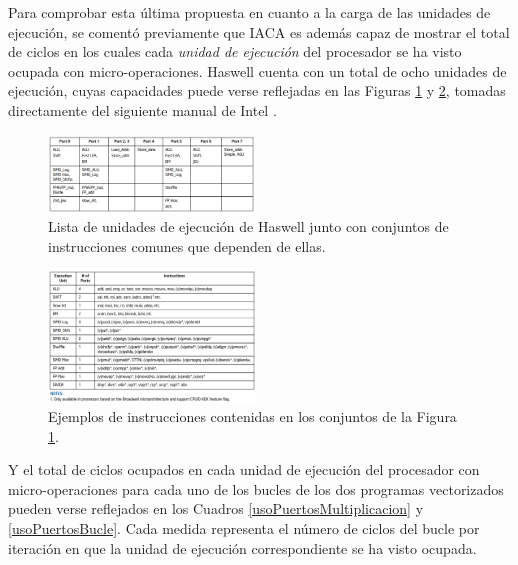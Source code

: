 \documentclass[conference]{IEEEtran}
\begin{document}
Para comprobar esta última propuesta en cuanto a la carga de las unidades de ejecución, se comentó previamente que IACA es además capaz de mostrar el total de ciclos en los cuales cada \textit{unidad de ejecución} del procesador se ha visto ocupada con micro-operaciones. Haswell cuenta con un total de ocho unidades de ejecución, cuyas capacidades puede verse reflejadas en las Figuras \ref{tablaUnidadesEjecucion} y \ref{tablaInstrucciones}, tomadas directamente del siguiente manual de Intel \cite{manualIntel}.

\begin{figure}[htbp]
    \centering
        \includegraphics[width=0.49\textwidth]{tablaUnidadesEjecucion.png}
        \caption{Lista de unidades de ejecución de Haswell junto con conjuntos de instrucciones comunes que dependen de ellas.}
        \label{tablaUnidadesEjecucion}
\end{figure}

\begin{figure}[htbp]
    \centering
        \includegraphics[width=0.49\textwidth]{tablaInstrucciones.png}
        \caption{Ejemplos de instrucciones contenidas en los conjuntos de la Figura \ref{tablaUnidadesEjecucion}.}
        \label{tablaInstrucciones}
\end{figure}

Y el total de ciclos ocupados en cada unidad de ejecución del procesador con micro-operaciones para cada uno de los bucles de los dos programas vectorizados pueden verse reflejados en los Cuadros \ref{usoPuertosMultiplicacion} y \ref{usoPuertosBucle}. Cada medida representa el número de ciclos del bucle por iteración en que la unidad de ejecución correspondiente se ha visto ocupada.
\end{document}
